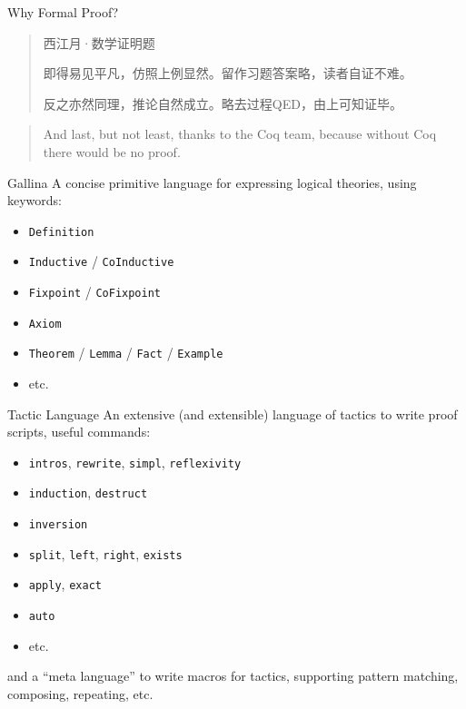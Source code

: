 \documentclass[usenames,xcolor=svgnames,11pt,sans,aspectratio=169]{beamer}
\let\t\texttt
\begin{document}
\begin{frame}{Why Formal Proof?}
  \linespread{1.5}
  \begin{quote}
    \begin{center}
      西江月·数学证明题
    \end{center}
    
    即得易见平凡，仿照上例显然。留作习题答案略，读者自证不难。
    
    反之亦然同理，推论自然成立。略去过程QED，由上可知证毕。

  \end{quote}
  \vspace{1cm}
  \pause
  \begin{quote}
    And last, but not least, thanks to the Coq team, because without Coq there would be no proof.

  \end{quote}
\end{frame}

\begin{frame}{Gallina}
  A concise primitive language for expressing logical theories, using keywords:
  \begin{itemize}
    \item \t{Definition}
    \item \t{Inductive} / \t{CoInductive}
    \item \t{Fixpoint} / \t{CoFixpoint}
    \item \t{Axiom}
    \item \t{Theorem} / \t{Lemma} / \t{Fact} / \t{Example}
    \item etc.
  \end{itemize}
\end{frame}

\begin{frame}{Tactic Language}
  An extensive (and extensible) language of tactics to write proof scripts, useful commands:
  \begin{itemize}
    \item \t{intros}, \t{rewrite}, \t{simpl}, \t{reflexivity}
    \item \t{induction}, \t{destruct}
    \item \t{inversion}
    \item \t{split}, \t{left}, \t{right}, \t{exists}
    \item \t{apply}, \t{exact}
    \item \t{auto}
    \item etc.
  \end{itemize}
  and a ``meta language'' to write macros for tactics, supporting pattern matching, composing,
  repeating, etc.
\end{frame}
\end{document}
